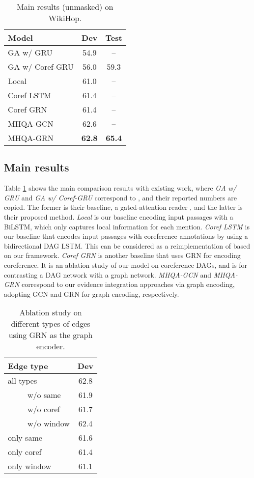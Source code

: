 \documentclass[letterpaper]{article}
\begin{document}
\begin{table}
\centering
\begin{tabular}{l|c|c}
Model & Dev & Test \\
\hline
GA w/ GRU & 54.9 & -- \\
GA w/ Coref-GRU & 56.0 & 59.3 \\
\hline
Local & 61.0 & -- \\
Coref LSTM & 61.4 & -- \\
Coref GRN & 61.4 & -- \\
MHQA-GCN & 62.6 & -- \\
MHQA-GRN & \bf 62.8 & \bf 65.4 \\
\end{tabular}
\caption{Main results (unmasked) on WikiHop.}
\label{tab:wikihop}
\end{table}


\subsection{Main results}


Table \ref{tab:wikihop} shows the main comparison results with existing work, where
\emph{GA w/ GRU} and \emph{GA w/ Coref-GRU} correspond to \citet{N18-2007}, and their reported numbers are copied.
The former is their baseline, a gated-attention reader \citep{dhingra-EtAl:2017:Long2}, and the latter is their proposed method.
\emph{Local} is our baseline encoding input passages with a BiLSTM, which only captures local information for each mention.
\emph{Coref LSTM} is our baseline that encodes input passages with coreference annotations by using a bidirectional DAG LSTM.
This can be considered as a reimplementation of \citet{N18-2007} based on our framework.
\emph{Coref GRN} is another baseline that uses GRN for encoding coreference.
It is an ablation study of our model on coreference DAGs, and is for contrasting a DAG network with a graph network.
\emph{MHQA-GCN} and \emph{MHQA-GRN} correspond to our evidence integration approaches via graph encoding, adopting GCN and GRN for graph encoding, respectively.


\begin{table}
\centering
\begin{tabular}{l|c}
Edge type & Dev \\
\hline
all types & 62.8 \\
~~~~~w/o same & 61.9 \\
~~~~~w/o coref & 61.7 \\
~~~~~w/o window & 62.4 \\
\hline
only same &  61.6 \\
only coref & 61.4 \\
only window & 61.1 \\
\end{tabular}
\caption{Ablation study on different types of edges using GRN as the graph encoder.}
\label{tab:dev_edges}
\end{table}
\end{document}
